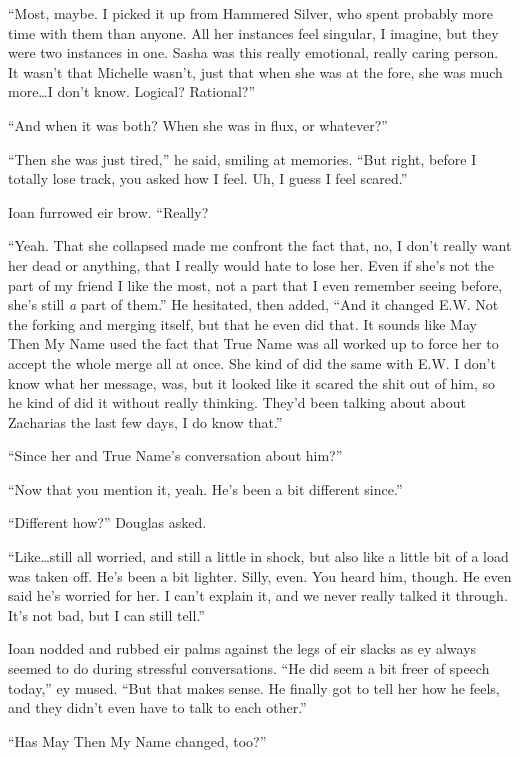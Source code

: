 ``Most, maybe. I picked it up from Hammered Silver, who spent probably more time with them than anyone. All her instances feel singular, I imagine, but they were two instances in one. Sasha was this really emotional, really caring person. It wasn't that Michelle wasn't, just that when she was at the fore, she was much more\ldots I don't know. Logical? Rational?''

``And when it was both? When she was in flux, or whatever?''

``Then she was just tired,'' he said, smiling at memories. ``But right, before I totally lose track, you asked how I feel. Uh, I guess I feel scared.''

Ioan furrowed eir brow. ``Really?

``Yeah. That she collapsed made me confront the fact that, no, I don't really want her dead or anything, that I really would hate to lose her. Even if she's not the part of my friend I like the most, not a part that I even remember seeing before, she's still \emph{a} part of them.'' He hesitated, then added, ``And it changed E.W. Not the forking and merging itself, but that he even did that. It sounds like May Then My Name used the fact that True Name was all worked up to force her to accept the whole merge all at once. She kind of did the same with E.W. I don't know what her message, was, but it looked like it scared the shit out of him, so he kind of did it without really thinking. They'd been talking about about Zacharias the last few days, I do know that.''

``Since her and True Name's conversation about him?''

``Now that you mention it, yeah. He's been a bit different since.''

``Different how?'' Douglas asked.

``Like\ldots still all worried, and still a little in shock, but also like a little bit of a load was taken off. He's been a bit lighter. Silly, even. You heard him, though. He even said he's worried for her. I can't explain it, and we never really talked it through. It's not bad, but I can still tell.''

Ioan nodded and rubbed eir palms against the legs of eir slacks as ey always seemed to do during stressful conversations. ``He did seem a bit freer of speech today,'' ey mused. ``But that makes sense. He finally got to tell her how he feels, and they didn't even have to talk to each other.''

``Has May Then My Name changed, too?''

